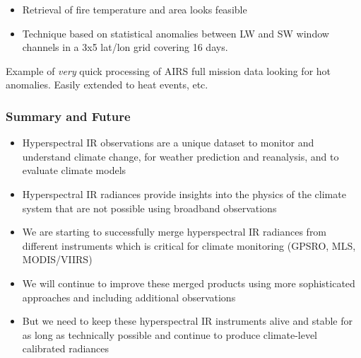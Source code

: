 \documentclass[10pt,t]{beamer}
\begin{document}
\begin{frame}
\vspace{-0.05in}

\small
\vspace{-0.05in}
\begin{itemize}
\item Retrieval of fire temperature and area looks feasible
\item Technique based on statistical anomalies between LW and SW window channels in a 3x5 lat/lon grid covering 16 days.
\end{itemize}
\vspace{-0.05in}
Example of \emph{very} quick processing of AIRS full mission data looking for hot anomalies.   Easily extended to heat events, etc.  
\end{frame}
\begin{frame}
\frametitle{Summary and Future}  
\begin{itemize}

\item Hyperspectral IR observations are a unique dataset to monitor
  and understand climate change, for weather prediction and
  reanalysis, and to evaluate climate models

\item Hyperspectral IR radiances provide insights into the physics of
  the climate system that are not possible using broadband
  observations

\item We are starting to successfully merge hyperspectral IR radiances
  from different instruments which is critical for climate monitoring
  (GPSRO, MLS, MODIS/VIIRS)

\item We will continue to improve these merged products using more
  sophisticated approaches and including additional observations

\item But we need to keep these hyperspectral IR instruments alive and
  stable for as long as technically possible and continue to produce
  climate-level calibrated radiances

\end{itemize}
\end{frame}
\end{document}
